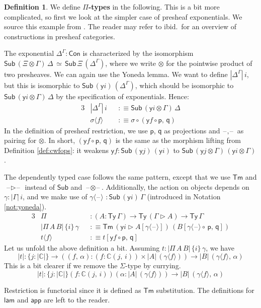 \documentclass[12pt,a4paper,twoside,openany]{book}
\theoremstyle{remark}
\theoremstyle{definition}
\newtheorem{mydefinition}{Definition}
\theoremstyle{theorem}
\newcommand{\ms}[1]{\mathsf{#1}}
\newcommand{\mbb}[1]{\mathbb{#1}}
\newcommand{\Con}{\mathsf{Con}}
\newcommand{\Sub}{\mathsf{Sub}}
\newcommand{\Tm}{\mathsf{Tm}}
\newcommand{\Ty}{\mathsf{Ty}}
\newcommand{\blank}{\mathord{\hspace{1pt}\text{--}\hspace{1pt}}}
\newcommand{\ext}{\triangleright}
\newcommand{\p}{\mathsf{p}}
\newcommand{\q}{\mathsf{q}}
\newcommand{\app}{\ms{app}}
\newcommand{\mbbC}{\mbb{C}}
\newcommand{\lam}{\ms{lam}}
\newcommand{\lab}{\langle}
\newcommand{\rab}{\rangle}
\newcommand{\defn}{:\equiv}
\newcommand{\yon}{\ms{y}}
\begin{document}
\begin{mydefinition}
We define \textbf{$\Pi$-types} in the following. This is a bit more complicated,
so first we look at the simpler case of presheaf exponentials. We source this
example from \cite[Section~I.]{maclane2012sheaves}. The reader may refer to
ibid.\ for an overview of constructions in presheaf categories.

The exponential $\Delta^\Gamma : \Con$ is characterized by the isomorphism
$\Sub\,(\Xi \otimes \Gamma)\,\Delta\,\simeq\,\Sub\,\Xi\,(\Delta^\Gamma)$, where
we write $\otimes$ for the pointwise product of two presheaves. We can again use
the Yoneda lemma. We want to define $|\Delta^\Gamma|\,i$, but this is isomorphic
to $\Sub\,(\yon i)\,(\Delta^\Gamma)$, which should be isomorphic to $\Sub\,(\yon
i \otimes \Gamma)\,\Delta$ by the specification of exponentials. Hence:
\begin{alignat*}{3}
  &|\Delta^\Gamma|\,i &&\defn \Sub\,(\yon i \otimes \Gamma)\,\Delta \\
  & \sigma \lab f \rab &&\defn \sigma \circ (\yon f \circ \p,\,\q)
\end{alignat*}
In the definition of presheaf restriction, we use $\p$, $\q$ as projections and
$\blank\!,\!\blank$ as pairing for $\otimes$. In short, $(\yon f \circ \p,\,\q)$
is the same as the morphism lifting from Definition \ref{def:cwfops}: it weakens
$\yon f : \Sub\,(\yon j)\,(\yon i)$ to $\Sub\,(\yon j \otimes \Gamma)\,(\yon i
\otimes \Gamma)$.

The dependently typed case follows the same pattern, except that we use $\Tm$
and $\blank\!\ext\!\blank$ instead of $\Sub$ and
$\blank\!\otimes\!\blank$. Additionally, the action on objects depends on
$\gamma : |\Gamma|\,i$, and we make use of $\gamma \lab \blank \rab\,\,:
\Sub\,(\yon i)\,\Gamma$ (introduced in Notation \ref{not:yoneda}).
\begin{alignat*}{3}
  & \Pi &&: (A : \Ty\,\Gamma) \to \Ty\,(\Gamma \ext A) \to \Ty\,\Gamma\\
  & |\Pi\,A\,B|\,\{i\}\,\gamma &&\defn \Tm\,(\yon i \ext A[\gamma \lab \blank \rab])\,(B[\gamma\lab\blank\rab \circ\,\p,\,\q])\\
  & t\lab f \rab &&\defn t[\yon f \circ \p,\, \q]
\end{alignat*}
Let us unfold the above definition a bit. Assuming $t : |\Pi\,A\,B|\,\{i\}\,\gamma$, we have
\[
|t| : \{j : |\mbbC|\}\to((f,\,\alpha) : (f : \mbbC(j,\,i)) \times |A|\,(\gamma\lab f \rab)) \to
       |B|\,(\gamma\lab f\rab,\,\alpha)
\]
This is a bit clearer if we remove the $\Sigma$-type by currying.
\[
|t| : \{j : |\mbbC|\}(f : \mbbC(j,\,i))(\alpha : |A|\,(\gamma \lab f \rab)) \to
       |B|\,(\gamma\lab f \rab,\,\alpha)
\]

Restriction is functorial since it is defined as $\Tm$ substitution. The definitions
for $\lam$ and $\app$ are left to the reader.
\end{mydefinition}
\end{document}

